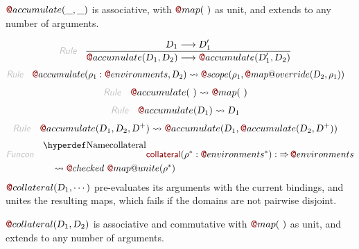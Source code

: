 $\FUN@accumulate
    (  \_, 
           \_ )$ is associative, with $\FUN@map
    (   \  )$ as unit, and extends to any
  number of arguments.

\begin{align*}
  \KEY{Rule} \quad
    & \RULE{
         \VAR{D}\SUB{1} \TRANS 
          \VAR{D}\SUB{1}'
      }{
         \FUN@accumulate
                      (  \VAR{D}\SUB{1}, 
                             \VAR{D}\SUB{2} ) \TRANS 
          \FUN@accumulate
            (  \VAR{D}\SUB{1}', 
                   \VAR{D}\SUB{2} )
      }
\end{align*}
\begin{align*}
  \KEY{Rule} \quad
    & \FUN@accumulate
        (  \VAR{\ensuremath{\rho}}\SUB{1} : \FUN@environments, 
               \VAR{D}\SUB{2} ) \leadsto 
        \FUN@scope
          (  \VAR{\ensuremath{\rho}}\SUB{1}, 
                 \FUN@map@override
                  (  \VAR{D}\SUB{2}, 
                         \VAR{\ensuremath{\rho}}\SUB{1} ) )
\end{align*}
\begin{align*}
  \KEY{Rule} \quad
    & \FUN@accumulate
        (   \  ) \leadsto 
        \FUN@map
          (   \  )
\end{align*}
\begin{align*}
  \KEY{Rule} \quad
    & \FUN@accumulate
        (  \VAR{D}\SUB{1} ) \leadsto 
        \VAR{D}\SUB{1}
\end{align*}
\begin{align*}
  \KEY{Rule} \quad
    & \FUN@accumulate
        (  \VAR{D}\SUB{1}, 
               \VAR{D}\SUB{2}, 
               \VAR{D}\PLUS ) \leadsto 
        \FUN@accumulate
          (  \VAR{D}\SUB{1}, 
                 \FUN@accumulate
                  (  \VAR{D}\SUB{2}, 
                         \VAR{D}\PLUS ) )
\end{align*}
\begin{align*}
  \KEY{Funcon} \quad
  & \FUNDEC{collateral}(
                     \VAR{\ensuremath{\rho}}\STAR : \FUN@environments\STAR) 
    :  \TO \FUN@environments \\&\quad
    \leadsto \FUN@checked \ 
               \FUN@map@unite
                 (  \VAR{\ensuremath{\rho}}\STAR )
\end{align*}
$\FUN@collateral
    (  \VAR{D}\SUB{1}, 
           \cdots )$ pre-evaluates its arguments with the current bindings,
  and unites the resulting maps, which fails if the domains are not pairwise
  disjoint.

$\FUN@collateral
    (  \VAR{D}\SUB{1}, 
           \VAR{D}\SUB{2} )$ is associative and commutative with $\FUN@map
    (   \  )$ as unit, 
  and extends to any number of arguments.

